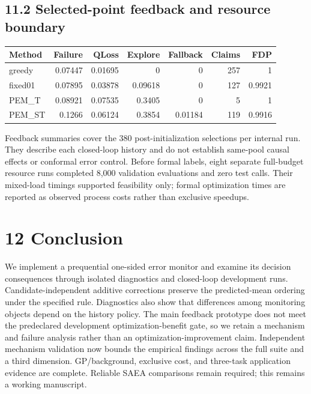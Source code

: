 \documentclass[11pt,a4paper]{article}
\begin{document}
\hypertarget{selected-point-feedback-and-resource-boundary}{%
\subsection{11.2 Selected-point feedback and resource
boundary}\label{selected-point-feedback-and-resource-boundary}}

\par\noindent\begin{minipage}{\linewidth}

\begin{longtable}[]{@{}lrrrrrr@{}}
\toprule
Method & Failure & QLoss & Explore & Fallback & Claims & FDP \\
\midrule
\endhead
greedy & 0.07447 & 0.01695 & 0 & 0 & 257 & 1 \\
fixed01 & 0.07895 & 0.03878 & 0.09618 & 0 & 127 & 0.9921 \\
PEM\_T & 0.08921 & 0.07535 & 0.3405 & 0 & 5 & 1 \\
PEM\_ST & 0.1266 & 0.06124 & 0.3854 & 0.01184 & 119 & 0.9916 \\
\bottomrule
\end{longtable}

\end{minipage}\par

Feedback summaries cover the 380 post-initialization selections per
internal run. They describe each closed-loop history and do not
establish same-pool causal effects or conformal error control. Before
formal labels, eight separate full-budget resource runs completed 8,000
validation evaluations and zero test calls. Their mixed-load timings
supported feasibility only; formal optimization times are reported as
observed process costs rather than exclusive speedups.

\hypertarget{conclusion}{%
\section{12 Conclusion}\label{conclusion}}

We implement a prequential one-sided error monitor and examine its
decision consequences through isolated diagnostics and closed-loop
development runs. Candidate-independent additive corrections preserve
the predicted-mean ordering under the specified rule. Diagnostics also
show that differences among monitoring objects depend on the history
policy. The main feedback prototype does not meet the predeclared
development optimization-benefit gate, so we retain a mechanism and
failure analysis rather than an optimization-improvement claim.
Independent mechanism validation now bounds the empirical findings
across the full suite and a third dimension. GP/background, exclusive
cost, and three-task application evidence are complete. Reliable SAEA
comparisons remain required; this remains a working manuscript.
\end{document}
